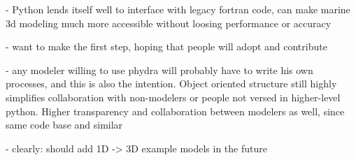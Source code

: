 \documentclass[journal abbreviation, manuscript]{copernicus}
\begin{document}
- Python lends itself well to interface with legacy fortran code, can make marine 3d modeling much more accessible without loosing performance or accuracy

- want to make the first step, hoping that people will adopt and contribute

- any modeler willing to use phydra will probably have to write his own processes, and this is also the intention. Object oriented structure still highly simplifies collaboration with non-modelers or people not versed in higher-level python. Higher transparency and collaboration between modelers as well, since same code base and similar 

- clearly: should add 1D -> 3D example models in the future






















\appendix
\section{}    %

\subsection{}     %


\noappendix       %
\end{document}
